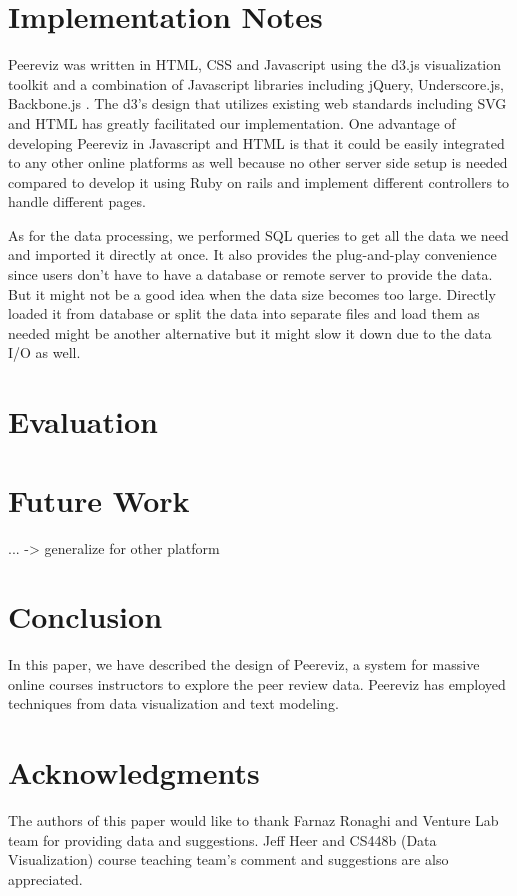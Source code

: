 \documentclass{sigchi}
\begin{document}
\section{Implementation Notes}
Peereviz was written in HTML, CSS and Javascript using the d3.js visualization
toolkit \cite{d3} and a combination of Javascript libraries including jQuery,
Underscore.js, Backbone.js \cite{jquery,underscore,backbone}.  The d3’s design that utilizes
existing web standards including SVG and HTML has greatly facilitated our
implementation. One advantage of developing Peereviz in Javascript and HTML is that it could be easily integrated to any other online platforms as well because no other server side setup is needed compared to develop it using Ruby on rails and implement different controllers to handle different pages.

As for the data processing, we performed SQL queries to get all the data we need and imported it directly at once. It also provides the plug-and-play convenience since users don't have to have a database or remote server to provide the data. But it might not be a good idea when the data size becomes too large. Directly loaded it from database or split the data into separate files and load them as needed might be another alternative but it might slow it down due to the data I/O as well.



\section{Evaluation}

\section{Future Work}
... -> generalize for other platform

\section{Conclusion}

In this paper, we have described the design of Peereviz, a system for massive online courses
instructors to explore the peer review data.   Peereviz has employed techniques
from data visualization and text modeling.

\section{Acknowledgments}
The authors of this paper would like to thank Farnaz Ronaghi and Venture Lab
team for providing data and suggestions.
Jeff Heer and CS448b (Data Visualization) course teaching team's comment
and suggestions are also appreciated.
\end{document}
